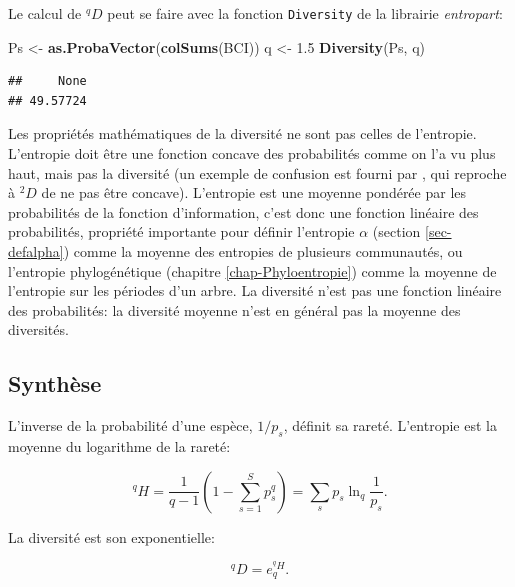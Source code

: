 \documentclass[
  11pt,
  french,
  a4paper,
  extrafontsizes,onecolumn,openright
  ]{memoir}
\newenvironment{Shaded}{\begin{snugshade}}{\end{snugshade}}
\newcommand{\FloatTok}[1]{\textcolor[rgb]{0.00,0.00,0.81}{#1}}
\newcommand{\KeywordTok}[1]{\textcolor[rgb]{0.13,0.29,0.53}{\textbf{#1}}}
\newcommand{\NormalTok}[1]{#1}
\newcommand{\StringTok}[1]{\textcolor[rgb]{0.31,0.60,0.02}{#1}}
\begin{document}
Le calcul de \(^{q}\!D\) peut se faire avec la fonction \texttt{Diversity} de la librairie \emph{entropart}:

\scriptsize

\begin{Shaded}
\begin{Highlighting}[]
\NormalTok{Ps <-}\StringTok{ }\KeywordTok{as.ProbaVector}\NormalTok{(}\KeywordTok{colSums}\NormalTok{(BCI))}
\NormalTok{q <-}\StringTok{ }\FloatTok{1.5}
\KeywordTok{Diversity}\NormalTok{(Ps, q)}
\end{Highlighting}
\end{Shaded}

\begin{verbatim}
##     None 
## 49.57724
\end{verbatim}

\normalsize

Les propriétés mathématiques de la diversité ne sont pas celles de l'entropie.
L'entropie doit être une fonction concave des probabilités comme on l'a vu plus haut, mais pas la diversité (un exemple de confusion est fourni par \textcite{Gadagkar1989}, qui reproche à \(^{2}\!D\) de ne pas être concave).
L'entropie est une moyenne pondérée par les probabilités de la fonction d'information, c'est donc une fonction linéaire des probabilités, propriété importante pour définir l'entropie \(\alpha\) (section \ref{sec-defalpha}) comme la moyenne des entropies de plusieurs communautés, ou l'entropie phylogénétique (chapitre \ref{chap-Phyloentropie}) comme la moyenne de l'entropie sur les périodes d'un arbre.
La diversité n'est pas une fonction linéaire des probabilités: la diversité moyenne n'est en général pas la moyenne des diversités.

\hypertarget{synthuxe8se-1}{%
\subsection{Synthèse}\label{synthuxe8se-1}}

L'inverse de la probabilité d'une espèce, \(1/p_s\), définit sa rareté.
L'entropie est la moyenne du logarithme de la rareté:

\begin{equation}
  \label{eq:EntropieRarete}
  ^{q}\!H = \frac{1}{q-1}\left(1-\sum^S_{s=1}{p^q_s}\right)=\sum_s{p_s}\ln_q\frac{1}{p_s}.
\end{equation}

La diversité est son exponentielle:

\begin{equation}
  \label{eq:DexpHSynthese}
  ^{q}\!D = e_q^{^{q}\!H}.
\end{equation}
\end{document}
